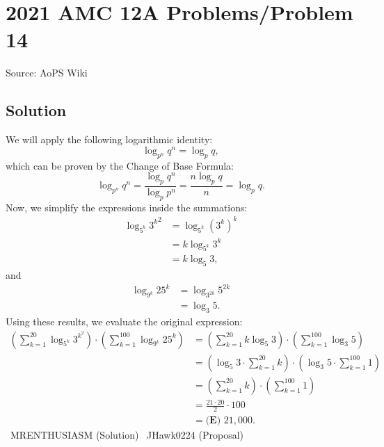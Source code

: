 \documentclass[12pt]{article}
\begin{document}
\section*{{2021 AMC 12A Problems/Problem 14}}
Source: AoPS Wiki

\subsection*{Solution}
We will apply the following logarithmic identity: \[\log_{p^n}{q^n}=\log_{p}{q},\] which can be proven by the Change of Base Formula: \[\log_{p^n}{q^n}=\frac{\log_{p}{q^n}}{\log_{p}{p^n}}=\frac{n\log_{p}{q}}{n}=\log_{p}{q}.\] Now, we simplify the expressions inside the summations: \begin{align*} \log_{5^k}{{3^k}^2}&=\log_{5^k}{(3^k)^k} \\ &=k\log_{5^k}{3^k} \\ &=k\log_{5}{3}, \end{align*} and \begin{align*} \log_{9^k}{25^k}&=\log_{3^{2k}}{5^{2k}} \\ &=\log_{3}{5}. \end{align*} Using these results, we evaluate the original expression: \begin{align*} \left(\sum_{k=1}^{20} \log_{5^k} 3^{k^2}\right)\cdot\left(\sum_{k=1}^{100} \log_{9^k} 25^k\right)&=\left(\sum_{k=1}^{20} k\log_{5}{3}\right)\cdot\left(\sum_{k=1}^{100} \log_{3}{5}\right) \\ &= \left(\log_{5}{3}\cdot\sum_{k=1}^{20} k\right)\cdot\left(\log_{3}{5}\cdot\sum_{k=1}^{100} 1\right) \\ &= \left(\sum_{k=1}^{20} k\right)\cdot\left(\sum_{k=1}^{100} 1\right) \\ &= \frac{21\cdot20}{2}\cdot100 \\ &= \boxed{\textbf{(E) }21{,}000}. \end{align*} ~MRENTHUSIASM (Solution) ~JHawk0224 (Proposal)
\end{document}
